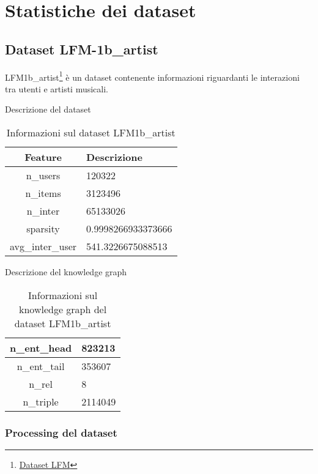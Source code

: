 \section{Statistiche dei dataset}

\subsection{Dataset LFM-1b\_artist}

LFM1b\_artist\footnote{\href{https://github.com/RUCAIBox/RecSysDatasets/blob/master/conversion_tools/usage/LFM-1b.md}{Dataset LFM}}{} è un dataset contenente informazioni riguardanti le interazioni tra utenti e artisti musicali.

\noindent Descrizione del dataset
\begin{table}[H]
    \centering
    \footnotesize
    \begin{tabularx}{\textwidth}{|c|X|}
        \hline
        \textbf{Feature} & \textbf{Descrizione} \\
        \hline
        n\_users & 120322 \\
        \hline
        n\_items & 3123496 \\
        \hline
        n\_inter & 65133026 \\
        \hline
        sparsity & 0.9998266933373666 \\
        \hline
        avg\_inter\_user & 541.3226675088513 \\
        \hline
    \end{tabularx}
    \caption{Informazioni sul dataset LFM1b\_artist}
    \label{tab:dataset_info}
\end{table}


\noindent Descrizione del knowledge graph
\begin{table}[H]
    \centering
    \footnotesize
    \begin{tabularx}{\textwidth}{|c|X|}
        \hline
        n\_ent\_head & 823213 \\
        \hline
        n\_ent\_tail & 353607 \\
        \hline
        n\_rel & 8 \\
        \hline
        n\_triple & 2114049 \\
        \hline
    \end{tabularx}
    \caption{Informazioni sul knowledge graph del dataset LFM1b\_artist}
    \label{tab:dataset_info}
\end{table}


\subsubsection{Processing del dataset}

